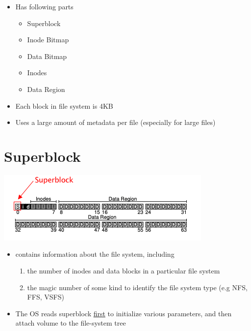 \documentclass[12pt]{article}
\begin{document}
\begin{itemize}
    \item Has following parts

    \begin{itemize}
        \item Superblock
        \item Inode Bitmap
        \item Data Bitmap
        \item Inodes
        \item Data Region
    \end{itemize}

    \item Each block in file system is 4KB
    \item Uses a large amount of metadata per file (especially for large files)
\end{itemize}

\section*{Superblock}

\begin{center}
\includegraphics[width=\linewidth]{images/midterm_2_solution_21.png}
\end{center}

\begin{itemize}
    \item contains information about the file system, including

    \begin{enumerate}[1.]
        \item the number of inodes and data blocks in a particular file system
        \item the magic number of some kind to identify the file system type (e.g NFS, FFS, VSFS)
    \end{enumerate}

    \item The OS reads superblock \underline{first} to initialize various parameters,
    and then attach volume to the file-system tree
\end{itemize}
\end{document}
